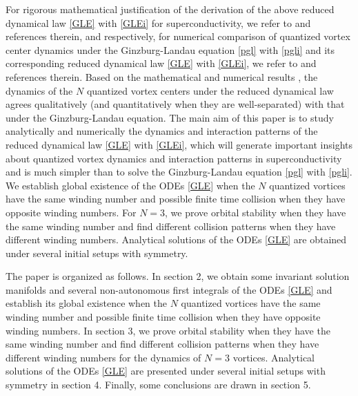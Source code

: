\documentclass{aims}
\theoremstyle{plain}
\theoremstyle{definition}
\newcommand{\bx}{{\mathbf x}}
\newcommand{\bX}{{\mathbf X}}
\begin{document}
For rigorous mathematical justification of the derivation of the above
reduced dynamical law \eqref{GLE} with \eqref{GLEi} for superconductivity,
we refer to \cite{Jerrard,Lin96} and references therein,
and respectively, for numerical comparison of quantized vortex center dynamics under the Ginzburg-Landau equation \eqref{pgl} with
\eqref{pgli} and its corresponding
reduced dynamical law \eqref{GLE} with \eqref{GLEi}, we refer to \cite{Zhang1,Zhang2} and references therein.
Based on the mathematical and numerical results \cite{Jerrard,Lin96,Zhang1,Zhang2},
the dynamics of the $N$ quantized vortex centers under
the reduced dynamical law agrees qualitatively (and quantitatively when
they are well-separated) with that under the Ginzburg-Landau equation.
The main aim of this paper is to study analytically and numerically the dynamics and interaction
patterns of the reduced dynamical law \eqref{GLE} with \eqref{GLEi}, which
will generate important insights about quantized vortex dynamics and interaction patterns in superconductivity and is much simpler
than to solve the Ginzburg-Landau equation \eqref{pgl} with
\eqref{pgli}. We establish global existence of the ODEs
\eqref{GLE} when the $N$ quantized vortices have the same winding number
and possible finite time collision when they have opposite winding numbers.
For $N=3$, we prove orbital stability when they have the same winding number and find different collision patterns when they have different winding numbers. Analytical solutions of the ODEs
\eqref{GLE} are obtained under several initial setups with symmetry.





 The paper is organized as follows.
In section 2, we obtain some invariant solution manifolds
and several non-autonomous
first integrals of the ODEs \eqref{GLE} and establish its global existence
when the $N$ quantized vortices have the same winding number
and possible finite time collision when they have opposite winding numbers.
In section 3, we prove orbital stability when they have the same winding number and find different collision patterns when they have different winding numbers for the dynamics of $N=3$ vortices.
Analytical solutions of the ODEs
\eqref{GLE} are presented under several initial setups with symmetry
in  section 4.  Finally, some conclusions are drawn in section 5.
\end{document}
